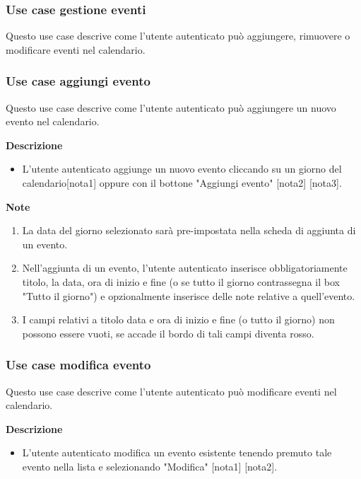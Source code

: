 \documentclass[a4paper,12pt]{article}
\begin{document}
\subsubsection*{Use case gestione eventi}

Questo use case descrive come l'utente autenticato può aggiungere, rimuovere o modificare eventi nel calendario.




\subsubsection*{Use case aggiungi evento}

Questo use case descrive come l'utente autenticato può aggiungere un nuovo evento nel calendario.


\textbf{Descrizione}
\begin{itemize} \setlength\itemsep{0.01em}
\item L'utente autenticato aggiunge un nuovo evento cliccando su un giorno del calendario[nota1] oppure con il bottone "Aggiungi evento" [nota2] [nota3].
\end{itemize}

\textbf{Note}
\begin{enumerate} \setlength\itemsep{0.01em}
\item La data del giorno selezionato sarà pre-impostata nella scheda di aggiunta di un evento.
\item Nell'aggiunta di un evento, l'utente autenticato inserisce obbligatoriamente titolo, la data, ora di inizio e fine (o se tutto il giorno contrassegna il box "Tutto il giorno") e opzionalmente inserisce delle note relative a quell'evento.
\item I campi relativi a titolo data e ora di inizio e fine (o tutto il giorno) non possono essere vuoti, se accade il bordo di tali campi diventa rosso.
\end{enumerate}



\subsubsection*{Use case modifica evento}

Questo use case descrive come l'utente autenticato può modificare eventi nel calendario.


\textbf{Descrizione}
\begin{itemize} \setlength\itemsep{0.01em}
\item L'utente autenticato modifica un evento esistente tenendo premuto tale evento nella lista e selezionando "Modifica"  [nota1] [nota2].
\end{itemize}
\end{document}
